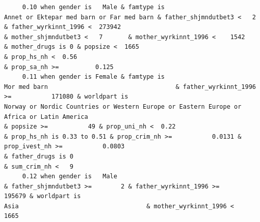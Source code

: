 \documentclass[
  letterpaper,
  DIV=11,
  numbers=noendperiod]{scrreprt}
\begin{document}
\begin{verbatim}
     0.10 when gender is   Male & famtype is                        Annet or Ektepar med barn or Far med barn & father_shjmndutbet3 <   2       & father_wyrkinnt_1996 <  273942                                                                                                                                                              & mother_shjmndutbet3 <   7       & mother_wyrkinnt_1996 <    1542           & mother_drugs is 0 & popsize <  1665                                                                            & prop_hs_nh <  0.56                                                                                                                                                   & prop_sa_nh >=          0.125                                                                                                                                      
     0.11 when gender is Female & famtype is                                                     Mor med barn                                   & father_wyrkinnt_1996 >=           171080 & worldpart is                                           Norway or Nordic Countries or Western Europe or Eastern Europe or Africa or Latin America                                                                                                  & popsize >=           49 & prop_uni_nh <  0.22                                              & prop_hs_nh is 0.33 to 0.51 & prop_crim_nh >=           0.0131 & prop_ivest_nh >=           0.0803                                                                                                                          & father_drugs is 0                                                                        & sum_crim_nh <   9
     0.12 when gender is   Male                                                                               & father_shjmndutbet3 >=        2 & father_wyrkinnt_1996 >=           195679 & worldpart is                                                                                                                                Asia                                   & mother_wyrkinnt_1996 <    1665                                                                                                                                                                                                                                                                                                                                                                                                                                                                       

\end{verbatim}
\end{document}
